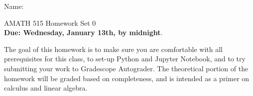 \documentclass[11pt]{amsart}
\begin{document}
{\Large Name:}  \\
\begin{center}
\Large AMATH 515 \hskip 2in Homework Set 0\\
{\bf Due:  Wednesday, January 13th, by midnight}. 
\end{center}

\bigskip

%
%
%

The goal of this homework is to make sure you are comfortable with all prerequisites for this class, to set-up Python and Jupyter Notebook, and to try submitting your work to Gradescope Autograder. 
The theoretical portion of the homework will be graded based on completeness, and is intended as a primer on calculus and linear algebra. 
\end{document}
